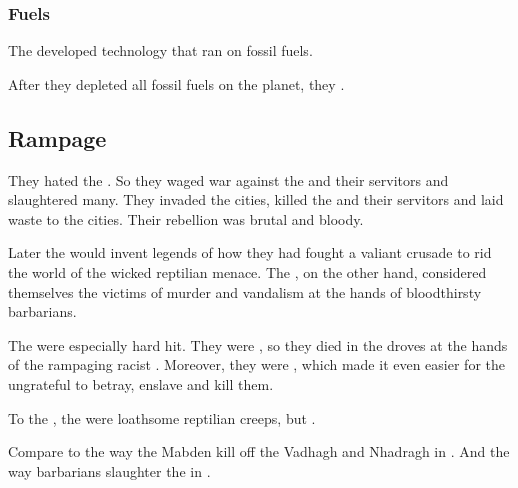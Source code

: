 \subsubsection{Fuels}
The \aryothim developed technology that ran on fossil fuels. 

After they depleted all fossil fuels on the planet, they . 








\subsection{Rampage}
They hated the . 
So they waged war against the \quiljaaran{} and their servitors and slaughtered many. 
They invaded the \quiljaaran{} cities, killed the \quiljaaran{} and their servitors and laid waste to the cities. 
Their rebellion was brutal and bloody.



Later the \aryothim{} would invent legends of how they had fought a valiant crusade to rid the world of the wicked reptilian menace. 
The \quiljaaran, on the other hand, considered themselves the victims of murder and vandalism at the hands of bloodthirsty barbarians. 

The \loculs{} were especially hard hit. 
They were , so they died in the droves at the hands of the rampaging racist \nephilim. 
Moreover, they were , which made it even easier for the ungrateful \nephilim{} to betray, enslave and kill them. 

To the \nephilim, the \loculs{} were loathsome reptilian creeps, but . 

Compare to the way the Mabden kill off the Vadhagh and Nhadragh in \cite{MichaelMoorcock:Corum}. 
And the way barbarians slaughter the  in \cite{TadWilliams:MemorySorrowandThorn}. 

